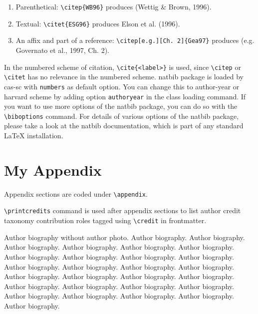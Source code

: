 \documentclass[a4paper,fleqn]{cas-sc}
\begin{document}
\begin{enumerate}[\textbullet]
\item Parenthetical: \verb+\citep{WB96}+ produces (Wettig \& Brown, 1996).
\item Textual: \verb+\citet{ESG96}+ produces Elson et al. (1996).
\item An affix and part of a reference:
\verb+\citep[e.g.][Ch. 2]{Gea97}+ produces (e.g. Governato et
al., 1997, Ch. 2).
\end{enumerate}

In the numbered scheme of citation, \verb+\cite{<label>}+ is used,
since \verb+\citep+ or \verb+\citet+ has no relevance in the numbered
scheme.  {natbib} package is loaded by {cas-sc} with
\verb+numbers+ as default option.  You can change this to author-year
or harvard scheme by adding option \verb+authoryear+ in the class
loading command.  If you want to use more options of the {natbib}
package, you can do so with the \verb+\biboptions+ command.  For
details of various options of the {natbib} package, please take a
look at the {natbib} documentation, which is part of any standard
\LaTeX{} installation.

\appendix
\section{My Appendix}
Appendix sections are coded under \verb+\appendix+.

\verb+\printcredits+ command is used after appendix sections to list 
author credit taxonomy contribution roles tagged using \verb+\credit+ 
in frontmatter.

\printcredits

%






\bio{}
Author biography without author photo.
Author biography. Author biography. Author biography.
Author biography. Author biography. Author biography.
Author biography. Author biography. Author biography.
Author biography. Author biography. Author biography.
Author biography. Author biography. Author biography.
Author biography. Author biography. Author biography.
Author biography. Author biography. Author biography.
Author biography. Author biography. Author biography.
Author biography. Author biography. Author biography.
\endbio
\end{document}

